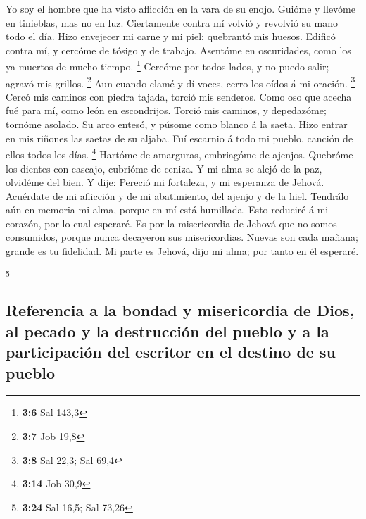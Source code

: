 Yo soy el hombre que ha visto aflicción en la vara de su
enojo.  Guióme y llevóme en tinieblas, mas no en luz.
 Ciertamente contra mí volvió y revolvió su mano todo el
día.  Hizo envejecer mi carne y mi piel; quebrantó mis
huesos.  Edificó contra mí, y cercóme de tósigo y de
trabajo.  Asentóme en oscuridades, como los ya muertos de
mucho tiempo. \footnote{\textbf{3:6} Sal 143,3}  Cercóme
por todos lados, y no puedo salir; agravó mis grillos. \footnote{\textbf{3:7}
  Job 19,8}  Aun cuando clamé y dí voces, cerro los oídos
á mi oración. \footnote{\textbf{3:8} Sal 22,3; Sal 69,4} 
Cercó mis caminos con piedra tajada, torció mis senderos.
 Como oso que acecha fué para mí, como león en
escondrijos.  Torció mis caminos, y depedazóme; tornóme
asolado.  Su arco entesó, y púsome como blanco á la
saeta.  Hizo entrar en mis riñones las saetas de su
aljaba.  Fuí escarnio á todo mi pueblo, canción de ellos
todos los días. \footnote{\textbf{3:14} Job 30,9} 
Hartóme de amarguras, embriagóme de ajenjos.  Quebróme
los dientes con cascajo, cubrióme de ceniza.  Y mi alma
se alejó de la paz, olvidéme del bien.  Y dije: Pereció
mi fortaleza, y mi esperanza de Jehová.  Acuérdate de mi
aflicción y de mi abatimiento, del ajenjo y de la hiel. 
Tendrálo aún en memoria mi alma, porque en mí está humillada.
 Esto reduciré á mi corazón, por lo cual esperaré.
 Es por la misericordia de Jehová que no somos
consumidos, porque nunca decayeron sus misericordias. 
Nuevas son cada mañana; grande es tu fidelidad.  Mi parte
es Jehová, dijo mi alma; por tanto en él esperaré.

\footnote{\textbf{3:24} Sal 16,5; Sal 73,26}

\hypertarget{referencia-a-la-bondad-y-misericordia-de-dios-al-pecado-y-la-destrucciuxf3n-del-pueblo-y-a-la-participaciuxf3n-del-escritor-en-el-destino-de-su-pueblo}{%
\subsection{Referencia a la bondad y misericordia de Dios, al pecado y
la destrucción del pueblo y a la participación del escritor en el
destino de su
pueblo}\label{referencia-a-la-bondad-y-misericordia-de-dios-al-pecado-y-la-destrucciuxf3n-del-pueblo-y-a-la-participaciuxf3n-del-escritor-en-el-destino-de-su-pueblo}}

